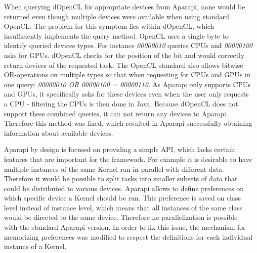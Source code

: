 \begin{description}[style=nextline]
	\item [No available devices]
	When querying dOpenCL for appropriate devices from Aparapi, none would be returned even though multiple devices were available when using standard OpenCL. The problem for this symptom lies within dOpenCL, which insufficiently implements the query method. OpenCL uses a single byte to identify queried devices types. For instance \textit{00000010} queries CPUs and \textit{00000100} asks for GPUs. dOpenCL checks for the position of the bit and would correctly return devices of the requested task. The OpenCL standard also allows bitwise OR-operations on multiple types so that when requesting for CPUs and GPUs in one query: \textit{00000010 OR 00000100 = 00000110}. As Aparapi only supports CPUs and GPUs, it specifically asks for these devices even when the user only requests a CPU - filtering the CPUs is then done in Java. Because dOpenCL does not support these combined queries, it can not return any devices to Aparapi. Therefore this method was fixed, which resulted in Aparapi successfully obtaining information about available devices.
	
	\item [Specific device choice]
	Aparapi by design is focused on providing a simple API, which lacks certain features that are important for the framework. For example it is desirable to have multiple instances of the same Kernel run in parallel with different data. Therefore it would be possible to split tasks into smaller subsets of data that could be distributed to various devices. Aparapi allows to define preferences on which specific device a Kernel should be run. This preference is saved on class level instead of instance level, which means that all instances of the same class would be directed to the same device. Therefore no parallelization is possible with the standard Aparapi version. In order to fix this issue, the mechanism for memorizing preferences was modified to respect the definitions for each individual instance of a Kernel.
	

\end{description}
